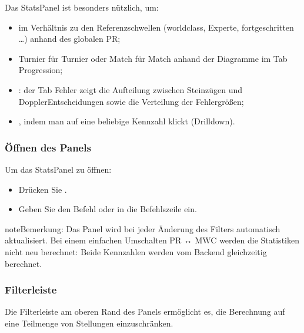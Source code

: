 \documentclass[letterpaper,10pt,german]{sphinxmanual}
\begin{document}
\sphinxAtStartPar
Das Stats\sphinxhyphen{}Panel ist besonders nützlich, um:
\begin{itemize}
\item {} 
\sphinxAtStartPar
{} im Verhältnis zu den Referenzschwellen (world\sphinxhyphen{}class, Experte, fortgeschritten …) anhand des globalen PR;

\item {} 
\sphinxAtStartPar
{} Turnier für Turnier oder Match für Match anhand der Diagramme im Tab Progression;

\item {} 
\sphinxAtStartPar
{}: der Tab Fehler zeigt die Aufteilung zwischen Steinzügen und Doppler\sphinxhyphen{}Entscheidungen sowie die Verteilung der Fehlergrößen;

\item {} 
\sphinxAtStartPar
{}, indem man auf eine beliebige Kennzahl klickt (Drill\sphinxhyphen{}down).

\end{itemize}


\subsubsection{Öffnen des Panels}
\label{\detokenize{manuel:ouverture-du-panneau}}
\sphinxAtStartPar
Um das Stats\sphinxhyphen{}Panel zu öffnen:
\begin{itemize}
\item {} 
\sphinxAtStartPar
Drücken Sie .

\item {} 
\sphinxAtStartPar
Geben Sie den Befehl  oder  in die Befehlszeile ein.

\end{itemize}

\begin{sphinxadmonition}{note}{Bemerkung:}
\sphinxAtStartPar
Das Panel wird bei jeder Änderung des Filters automatisch aktualisiert. Bei einem einfachen Umschalten PR ↔ MWC werden die Statistiken nicht neu berechnet: Beide Kennzahlen werden vom Backend gleichzeitig berechnet.
\end{sphinxadmonition}


\subsubsection{Filterleiste}
\label{\detokenize{manuel:barre-de-filtre}}
\sphinxAtStartPar
Die Filterleiste am oberen Rand des Panels ermöglicht es, die Berechnung auf eine Teilmenge von Stellungen einzuschränken.
\end{document}
